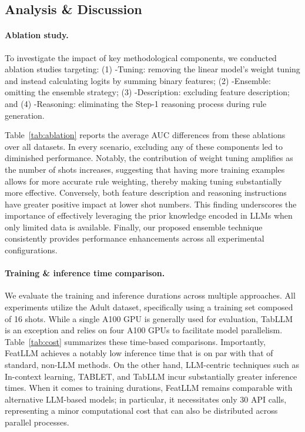 \subsection{Analysis \& Discussion}
\label{sec:analysis}
\paragraph{Ablation study.} To investigate the impact of key methodological components, we conducted ablation studies targeting: (1) \textsf{-Tuning}: removing the linear model’s weight tuning and instead calculating logits by summing binary features; (2) \textsf{-Ensemble}: omitting the ensemble strategy; (3) \textsf{-Description}: excluding feature description; and (4) \textsf{-Reasoning}: eliminating the Step-1 reasoning process during rule generation.

Table~\ref{tab:ablation} reports the average AUC differences from these ablations over all datasets. In every scenario, excluding any of these components led to diminished performance. Notably, the contribution of weight tuning amplifies as the number of shots increases, suggesting that having more training examples allows for more accurate rule weighting, thereby making tuning substantially more effective. Conversely, both feature description and reasoning instructions have greater positive impact at lower shot numbers. This finding underscores the importance of effectively leveraging the prior knowledge encoded in LLMs when only limited data is available. Finally, our proposed ensemble technique consistently provides performance enhancements across all experimental configurations.

\vspace*{-0.12in}
\paragraph{Training \& inference time comparison.} We evaluate the training and inference durations across multiple approaches. All experiments utilize the Adult dataset, specifically using a training set composed of 16 shots. While a single A100 GPU is generally used for evaluation, TabLLM is an exception and relies on four A100 GPUs to facilitate model parallelism. Table~\ref{tab:cost} summarizes these time-based comparisons. Importantly, \textsf{FeatLLM} achieves a notably low inference time that is on par with that of standard, non-LLM methods. On the other hand, LLM-centric techniques such as In-context learning, TABLET, and TabLLM incur substantially greater inference times. When it comes to training durations, \textsf{FeatLLM} remains comparable with alternative LLM-based models; in particular, it necessitates only 30 API calls, representing a minor computational cost that can also be distributed across parallel processes.

